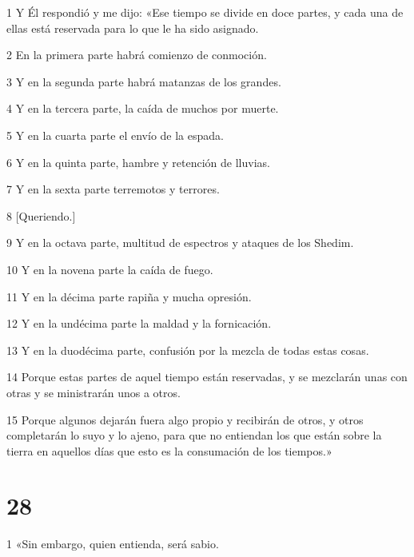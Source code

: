 \par 1 Y Él respondió y me dijo: «Ese tiempo se divide en doce partes, y cada una de ellas está reservada para lo que le ha sido asignado.

\par 2 En la primera parte habrá comienzo de conmoción.

\par 3 Y en la segunda parte habrá matanzas de los grandes.

\par 4 Y en la tercera parte, la caída de muchos por muerte.

\par 5 Y en la cuarta parte el envío de la espada.

\par 6 Y en la quinta parte, hambre y retención de lluvias.

\par 7 Y en la sexta parte terremotos y terrores.

\par 8 [Queriendo.]

\par 9 Y en la octava parte, multitud de espectros y ataques de los Shedim.

\par 10 Y en la novena parte la caída de fuego.

\par 11 Y en la décima parte rapiña y mucha opresión.

\par 12 Y en la undécima parte la maldad y la fornicación.

\par 13 Y en la duodécima parte, confusión por la mezcla de todas estas cosas.

\par 14 Porque estas partes de aquel tiempo están reservadas, y se mezclarán unas con otras y se ministrarán unos a otros.

\par 15 Porque algunos dejarán fuera algo propio y recibirán de otros, y otros completarán lo suyo y lo ajeno, para que no entiendan los que están sobre la tierra en aquellos días que esto es la consumación de los tiempos.»

\chapter{28}

\par 1 «Sin embargo, quien entienda, será sabio.

